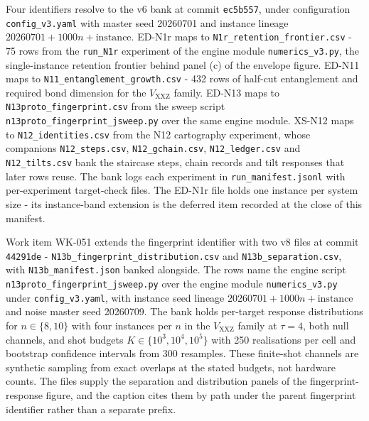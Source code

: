Four identifiers resolve to the v6 bank at commit \texttt{ec5b557}, under configuration \texttt{config\_v3.yaml} with master seed 20260701 and instance lineage $20260701 + 1000n + \mathrm{instance}$. ED-N1r maps to \texttt{N1r\_retention\_frontier.csv} - 75 rows from the \texttt{run\_N1r} experiment of the engine module \texttt{numerics\_v3.py}, the single-instance retention frontier behind panel (c) of the envelope figure. ED-N11 maps to \texttt{N11\_entanglement\_growth.csv} - 432 rows of half-cut entanglement and required bond dimension for the $V_{\mathrm{XXZ}}$ family. ED-N13 maps to \texttt{N13proto\_fingerprint.csv} from the sweep script \texttt{n13proto\_fingerprint\_jsweep.py} over the same engine module. XS-N12 maps to \texttt{N12\_identities.csv} from the N12 cartography experiment, whose companions \texttt{N12\_steps.csv}, \texttt{N12\_gchain.csv}, \texttt{N12\_ledger.csv} and \texttt{N12\_tilts.csv} bank the staircase steps, chain records and tilt responses that later rows reuse. The bank logs each experiment in \texttt{run\_manifest.jsonl} with per-experiment target-check files. The ED-N1r file holds one instance per system size - its instance-band extension is the deferred item recorded at the close of this manifest.

Work item WK-051 extends the fingerprint identifier with two v8 files at commit \texttt{44291de} - \texttt{N13b\_fingerprint\_distribution.csv} and \texttt{N13b\_separation.csv}, with \texttt{N13b\_manifest.json} banked alongside. The rows name the engine script \texttt{n13proto\_fingerprint\_jsweep.py} over the engine module \texttt{numerics\_v3.py} under \texttt{config\_v3.yaml}, with instance seed lineage $20260701 + 1000n + \mathrm{instance}$ and noise master seed 20260709. The bank holds per-target response distributions for $n \in \{8, 10\}$ with four instances per $n$ in the $V_{\mathrm{XXZ}}$ family at $\tau = 4$, both null channels, and shot budgets $K \in \{10^{3}, 10^{4}, 10^{5}\}$ with 250 realisations per cell and bootstrap confidence intervals from 300 resamples. These finite-shot channels are synthetic sampling from exact overlaps at the stated budgets, not hardware counts. The files supply the separation and distribution panels of the fingerprint-response figure, and the caption cites them by path under the parent fingerprint identifier rather than a separate prefix.

